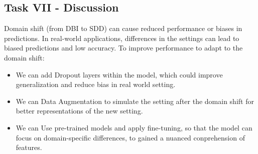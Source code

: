 \documentclass{article}
\begin{document}
\subsection*{Task VII - Discussion}
Domain shift (from DBI to SDD) can cause reduced performance or biases in predictions. 
In real-world applications, differences in the settings can lead to biased predictions and low accuracy.\newline
To improve performance to adapt to the domain shift: 
\begin{itemize}
  \item We can add Dropout layers within the model, which could improve generalization and reduce bias in real world setting.
  \item We can Data Augmentation to simulate the setting after the domain shift for better representations of the new setting.
  \item We can Use pre-trained models and apply fine-tuning, so that the model can focus on domain-specific differences, to gained a nuanced conprehension of features.
\end{itemize}
\end{document}

